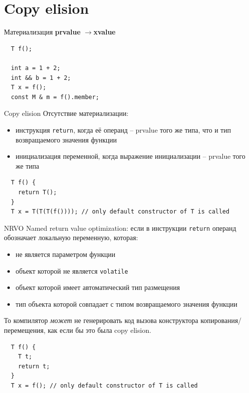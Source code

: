 \documentclass[unknownkeysallowed,xcolor=table]{beamer}
\newcommand{\rarr}{$\rightarrow$}
\begin{document}

\section{Copy elision}

\begin{frame}[fragile]{Материализация}
  \textbf{prvalue} \rarr \textbf{xvalue}

  \vspace{2em}

  \begin{lstlisting}
  T f();

  int a = 1 + 2;
  int && b = 1 + 2;
  T x = f();
  const M & m = f().member;
  \end{lstlisting}
\end{frame}

\begin{frame}[fragile]{Copy elision}
  Отсутствие материализации: \vspace{1em}
  \begin{itemize}
    \item инструкция \lstinline{return}, когда её операнд -- prvalue того же типа, что и тип возвращаемого значения функции \vspace{1em}
    \item инициализация переменной, когда выражение инициализации -- prvalue того же типа
  \end{itemize}

  \vspace{1em}
  \begin{lstlisting}
  T f() {
    return T();
  }
  T x = T(T(T(f()))); // only default constructor of T is called
  \end{lstlisting}
\end{frame}

\begin{frame}[fragile]{NRVO}
  Named return value optimization: если в инструкции \lstinline{return} операнд обозначает локальную переменную, которая:
  \begin{itemize}
    \item не является параметром функции
    \item объект которой не является \lstinline{volatile}
    \item объект которой имеет автоматический тип размещения
    \item тип объекта которой совпадает с типом возвращаемого значения функции
  \end{itemize}
  То компилятор \emph{может} не генерировать код вызова конструктора копирования/перемещения, как если бы это была copy elision.

  \begin{lstlisting}
  T f() {
    T t;
    return t;
  }
  T x = f(); // only default constructor of T is called
  \end{lstlisting}
\end{frame}
\end{document}

